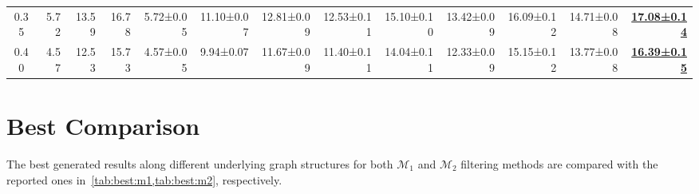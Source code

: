 \documentclass[a4paper, 10pt]{article}
\begin{document}
\begin{table*}[ht]
{\begin{tabular}{@{}crrrrrrrrrrrr@{}}
			0.35        & 5.72                                       & 13.59                                                                    & 16.78                                 & 5.72±0.05                     & 11.10±0.07                            & 12.81±0.09                            & 12.53±0.11                            & 15.10±0.10                            & 13.42±0.09                            & 16.09±0.12                            & 14.71±0.08                            & \underline{\textbf{17.08±0.14}}       \\
			0.40        & 4.57                                       & 12.53                                                                    & 15.73                                 & 4.57±0.05                     & 9.94±0.07                             & 11.67±0.09                            & 11.40±0.11                            & 14.04±0.11                            & 12.33±0.09                            & 15.15±0.12                            & 13.77±0.08                            & \underline{\textbf{16.39±0.15}}       \\
			\bottomrule
		\end{tabular}
	}
\end{table*}

\section{Best Comparison}
The best generated results along different underlying graph structures for both \(\mathcal{M}_1\) and \(\mathcal{M}_2\) filtering methods are compared with the reported ones in~\cref{tab:best:m1,tab:best:m2}, respectively.
\end{document}
